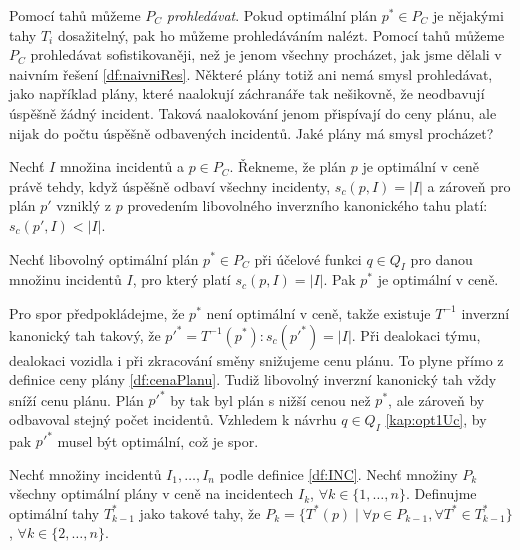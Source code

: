 Pomocí tahů můžeme $P_C$ \textit{prohledávat}.
Pokud optimální plán $p^* \in P_C$ je nějakými tahy $T_i$ dosažitelný, pak ho můžeme prohledáváním nalézt.
Pomocí tahů můžeme $P_C$ prohledávat sofistikovaněji, než je jenom všechny procházet, jak jsme dělali v naivním řešení \ref{df:naivniRes}.
Některé plány totiž ani nemá smysl prohledávat, jako například plány, které naalokují záchranáře tak nešikovně, že neodbavují úspěšně žádný incident.
Taková naalokování jenom přispívají do ceny plánu, ale nijak do počtu úspěšně odbavených incidentů.
Jaké plány má smysl procházet?

\begin{definice}\label{veta:planOptVCene}
  Nechť $I$ množina incidentů a $p \in P_C$.
  Řekneme, že plán $p$ je optimální v ceně právě tehdy, když úspěšně odbaví všechny incidenty, $s_c(p, I) = |I|$ a zároveň
  pro plán $p'$ vzniklý z $p$ provedením libovolného inverzního kanonického tahu platí: $s_c(p', I) < |I|$.
\end{definice}

\begin{veta}
  Nechť libovolný optimální plán $p^* \in P_C$ při účelové funkci $q \in Q_I$ pro danou množinu incidentů $I$, pro který platí $s_c(p, I) = |I|$.
  Pak $p^*$ je optimální v ceně.
\end{veta}
\begin{dukaz}
  Pro spor předpokládejme, že $p^*$ není optimální v ceně, takže existuje $T^{-1}$ inverzní kanonický tah takový, že $p'^* = T^{-1}(p^*) \colon s_c(p'^*) = |I|$.
  Při dealokaci týmu, dealokaci vozidla i při zkracování směny snižujeme cenu plánu. To plyne přímo z definice ceny plány \ref{df:cenaPlanu}.
  Tudiž libovolný inverzní kanonický tah vždy sníží cenu plánu. 
  Plán $p'^*$ by tak byl plán s nižší cenou než $p^*$, ale zároveň by odbavoval stejný počet incidentů.
  Vzhledem k návrhu $q \in Q_I$ \ref{kap:opt1Uc}, by pak $p'^*$ musel být optimální, což je spor.
\end{dukaz}

\begin{definice}
  Nechť množiny incidentů $I_1, \dots, I_n$ podle definice \ref{df:INC}.
  Nechť množiny $P_{k}$ všechny optimální plány v ceně na incidentech $I_k$, $\forall k \in \{ 1, \dots, n \}$.
  Definujme optimální tahy $T^*_{k-1}$ jako takové tahy, že $ P_k = \{ T^*(p) \mid \forall p \in P_{k-1}, \forall T^* \in T^*_{k-1} \}$, $\forall k \in \{ 2, \dots, n \}$.
\end{definice}


